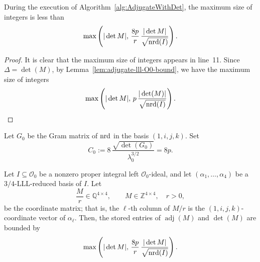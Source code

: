 \begin{lemma}
\label{lem:adjugate-bound}
During the execution of Algorithm~\ref{alg:AdjugateWithDet}, the maximum size of integers is less than \[\max\left(|\det M|,\,\frac{8p}{r}\,\frac{|\det M|}{\sqrt{\mathrm{nrd}(I)}}\right).\]
\end{lemma}

\begin{proof}
It is clear that the maximum size of integers appears in line~11.
Since $\Delta = \det(M)$, by Lemma~\ref{lem:adjugate-lll-O0-bound}, we have the maximum size of integers
\[\max\left(|\det M|,\,p\,\frac{|\det(M)|}{\sqrt{\mathrm{nrd}(I)}}\right).\]
\end{proof}

\begin{lemma}
\label{lem:adjugate-lll-O0-bound}
Let $G_0$ be the Gram matrix of $\mathrm{nrd}$ in the basis $(1,i,j,k)$.
Set
\[
  C_0
  :=
  8\,\frac{\sqrt{\det(G_0)}}{\lambda_0^{3/2}}
  =
  8p.
\]

Let \(I\subseteq \mathcal O_0\) be a nonzero proper integral left
\(\mathcal O_0\)-ideal, and let
$(\alpha_1,\ldots,\alpha_4)$ be a \(3/4\)-LLL-reduced basis of \(I\).
Let
\[
  \frac{M}{r}\in\mathbb Q^{4\times 4},
  \qquad M\in\mathbb Z^{4\times 4},\quad r>0,
\]
be the coordinate matrix; that is,
the \(\ell\)-th column of \(M/r\) is the \((1,i,j,k)\)-coordinate vector of \(\alpha_\ell\).
Then, the stored entries of \(\operatorname{adj}(M)\) and \(\det(M)\) are
bounded by
\[
  \max\left(
    |\det M|,\,
    \frac{8p}{r}\,\frac{|\det M|}{\sqrt{\mathrm{nrd}(I)}}
  \right).
\]
\end{lemma}

